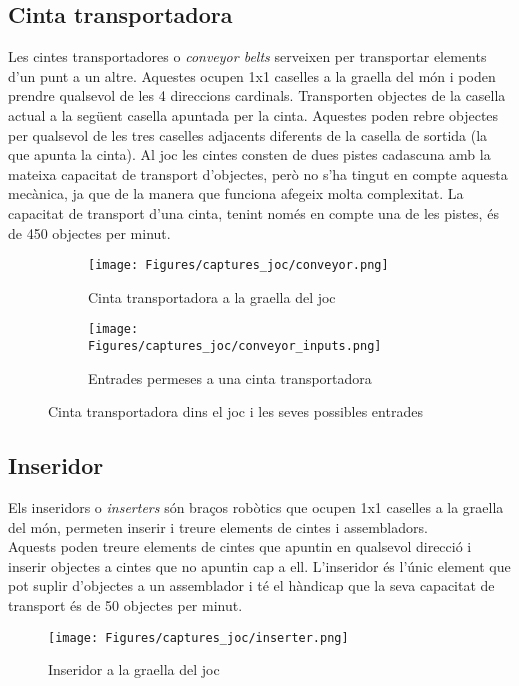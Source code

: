 \subsection{Cinta transportadora}
Les cintes transportadores o \textit{conveyor belts} serveixen per transportar elements d'un punt a un altre. Aquestes ocupen 1x1 caselles a la graella del món i poden prendre qualsevol de les 4 direccions cardinals. Transporten objectes de la casella actual a la següent casella apuntada per la cinta. Aquestes poden rebre objectes per qualsevol de les tres caselles adjacents diferents de la casella de sortida (la que apunta la cinta).
Al joc les cintes consten de dues pistes cadascuna amb la mateixa capacitat de transport d'objectes, però no s'ha tingut en compte aquesta mecànica, ja que de la manera que funciona afegeix molta complexitat.
La capacitat de transport d'una cinta, tenint només en compte una de les pistes, és de 450 objectes per minut.
\begin{figure}[ht]
    \centering
    \begin{subfigure}{0.45\textwidth}
        \texttt{[image: Figures/captures\_joc/conveyor.png]}
        \caption{Cinta transportadora a la graella del joc}
    \end{subfigure}
    \hfill
    \begin{subfigure}{0.45\textwidth}
        \texttt{[image: Figures/captures\_joc/conveyor\_inputs.png]}
        \caption{Entrades permeses a una cinta transportadora}
    \end{subfigure}
    \caption{Cinta transportadora dins el joc i les seves possibles entrades}
    \label{fig:conveyor_in_out}
\end{figure}

\subsection{Inseridor}
Els inseridors o \textit{inserters} són braços robòtics que ocupen 1x1 caselles a la graella del món, permeten inserir i treure elements de cintes i assembladors.\\
Aquests poden treure elements de cintes que apuntin en qualsevol direcció i inserir objectes a cintes que no apuntin cap a ell. L'inseridor és l'únic element que pot suplir d'objectes a un assemblador i té el hàndicap que la seva capacitat de transport és de 50 objectes per minut.

\begin{figure}[H]
    \centering
    \texttt{[image: Figures/captures\_joc/inserter.png]}
    \caption{Inseridor a la graella del joc}
    \label{fig:in_game_inserter}
\end{figure}


